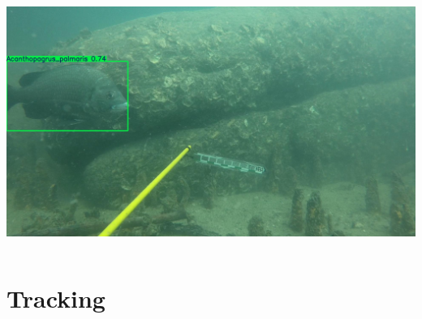 \documentclass[serif]{beamer}  %
\begin{document}
\begin{frame}
\begin{columns}
\begin{column}{0.5\textwidth}
	\centering
	\includegraphics[width=\textwidth]{images/9908_Acanthopagrus_palmaris_f000010.jpg}
\end{column}
\end{columns}


\end{frame}

\section{Tracking}
\end{document}
